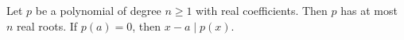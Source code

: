 Let $p$ be a polynomial of degree $n \geq 1$ with real coefficients.
Then $p$ has at most $n$ real roots.
If $p(a) = 0$, then $x - a \mid p(x)$.